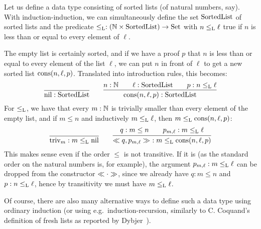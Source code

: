 \documentclass{article}
\begin{document}
\begin{example}
\label{ex:sorted-list}

Let us define a data type consisting of sorted lists (of natural
numbers, say). With induction-induction, we can simultaneously define
the set $\text{SortedList}$ of sorted lists and the predicate $\leq_{\text{L}} :
(\mathbb{N} \times \text{SortedList}) \to \text{Set}$ with $n \leq_{\text{L}} \ell$ true if
$n$ is less than or equal to every element of $\ell$.

The empty list is certainly sorted, and if we have a proof $p$ that
$n$ is less than or equal to every element of the list $\ell$, we can
put $n$ in front of $\ell$ to get a new sorted list
$\text{cons}(n, \ell, p)$. Translated into introduction rules, this becomes:
\[
\infer{\nilList : \SortedList}{} \qquad
\infer{\consList{n}{\ell}{p} : \SortedList}{n : \Nat \quad & \ell : \SortedList \quad & p : n \lessList \ell}
\]
For $\leq_{\text{L}}$, we have that every $m : \mathbb{N}$ is trivially smaller
than every element of the empty list, and if $m \leq n$ and
inductively $m \leq_{\text{L}} \ell$, then $m \leq_{\text{L}} \text{cons}(n, \ell, p)$:
\[
\infer{\nilLess{m} : m \lessList \nilList}
{} \qquad
\infer{\consLess{n}{\ell}{p}{m}{q}{p_{m, \ell}}\ : m \lessList \consList{n}{\ell}{p}}
       {q : m \leq n \quad & p_{m, \ell} : m \lessList \ell}
\]
This makes sense even if the order $\leq$ is not transitive. If it is
(as the standard order on the natural numbers is, for example), the
argument $p_{m, \ell} : m \leq_{\text{L}} \ell$ can be dropped from the
constructor $\ll \cdot \gg$, since we already have $q : m \leq n$ and
$p : n \leq_{\text{L}} \ell$, hence by transitivity we must have $m
\leq_{\text{L}} \ell$.

Of course, there are also many alternative ways to define such a data
type using ordinary induction (or using e.g.\ induction-recursion,
similarly to C. Coquand's definition of fresh lists as reported by
Dybjer~\cite{dybjer2000IR}).
\blackqed
\end{example}
\end{document}

